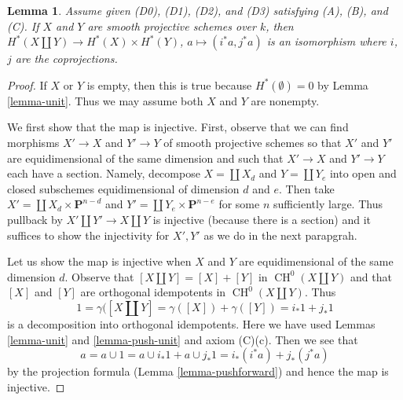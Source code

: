 \documentclass{stacks-project}
\theoremstyle{plain}
\newtheorem{lemma}[subsection]{Lemma}
\theoremstyle{definition}
\theoremstyle{remark}
\numberwithin{equation}{subsection}
\def\CH{\mathop{\mathrm{CH}}\nolimits}
\begin{document}
\begin{lemma}
\label{lemma-weil-additive}
Assume given (D0), (D1), (D2), and (D3) satisfying (A), (B), and (C).
If $X$ and $Y$ are smooth projective schemes over $k$, then
$H^*(X \amalg Y) \to H^*(X) \times H^*(Y)$,
$a \mapsto (i^*a, j^*a)$ is an isomorphism where $i$, $j$
are the coprojections.
\end{lemma}

\begin{proof}
If $X$ or $Y$ is empty, then this is true because
$H^*(\emptyset) = 0$ by Lemma \ref{lemma-unit}.
Thus we may assume both $X$ and $Y$ are nonempty.

\medskip\noindent
We first show that the map is injective. First, observe that
we can find morphisms $X' \to X$ and $Y' \to Y$
of smooth projective schemes so that $X'$ and $Y'$ are
equidimensional of the same dimension and such that
$X' \to X$ and $Y' \to Y$ each have a section. Namely,
decompose $X = \coprod X_d$ and $Y = \coprod Y_e$
into open and closed subschemes equidimensional of
dimension $d$ and $e$. Then take
$X' = \coprod X_d \times \mathbf{P}^{n - d}$
and $Y' = \coprod Y_e \times \mathbf{P}^{n - e}$ for some
$n$ sufficiently large. Thus pullback by
$X' \amalg Y' \to X \amalg Y$ is injective
(because there is a section) and
it suffices to show the injectivity for $X', Y'$
as we do in the next parapgrah.

\medskip\noindent
Let us show the map is injective when $X$ and $Y$ are equidimensional
of the same dimension $d$.
Observe that $[X \amalg Y] = [X] + [Y]$ in $\CH^0(X \amalg Y)$
and that $[X]$ and $[Y]$ are orthogonal idempotents in $\CH^0(X \amalg Y)$.
Thus
$$
1 = \gamma([X \amalg Y] = \gamma([X]) + \gamma([Y]) = i_*1 + j_*1
$$
is a decomposition into orthogonal idempotents. Here we have used
Lemmas \ref{lemma-unit} and \ref{lemma-push-unit} and axiom (C)(c).
Then we see that
$$
a = a \cup 1 = a \cup i_*1 + a \cup j_*1 =
i_*(i^*a) + j_*(j^*a)
$$
by the projection formula (Lemma \ref{lemma-pushforward}) and hence the map
is injective.


\end{proof}
\end{document}
